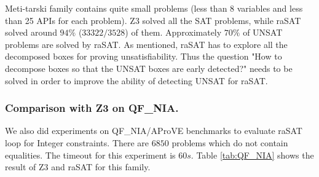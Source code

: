 Meti-tarski family contains quite small problems (less than 8 variables and less than 25 APIs for each problem). Z3 solved all the SAT problems, while raSAT solved around $94\%$ ($33322/3528$) of them. Approximately $70\%$ of UNSAT problems are solved by raSAT. As mentioned, raSAT has to explore all the decomposed boxes for proving unsatisfiability. Thus the question "How to decompose boxes so that the UNSAT boxes are early detected?" needs to be solved in order to improve the ability of detecting UNSAT for raSAT.
\begin{table*}[t]
\centering
{}
\medskip
\caption{Experimental results for Hong, Zankl, and Meti-Tarski families}
\label{tab:QF_NRA}
\end{table*}

\subsubsection{Comparison with Z3 on QF\_NIA.}
We also did experiments on QF\_NIA/AProVE benchmarks to evaluate raSAT loop for Integer constraints. There are $6850$ problems which do not contain equalities. The timeout for this experiment is $60s$. Table \ref{tab:QF_NIA} shows the result of Z3 and raSAT for this family.

\begin{table*}[t]
\centering
{}
    \medskip
   	\caption{Experiments on QF\_NIA/AProVE}
   	\label{tab:QF_NIA}
\end{table*}
 
